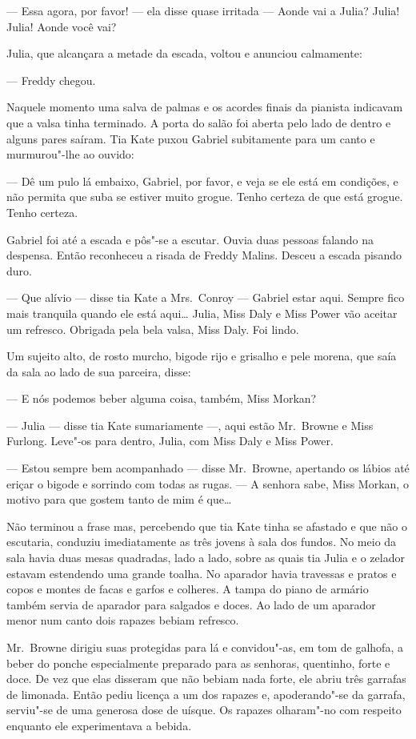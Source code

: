 --- Essa agora, por favor! --- ela disse quase irritada --- Aonde vai a Julia?
Julia!  Julia!  Aonde você vai?

Julia, que alcançara a metade da escada, voltou e anunciou calmamente:

--- Freddy chegou.

Naquele momento uma salva de palmas e os acordes finais da pianista indicavam
que a valsa tinha terminado.  A porta do salão foi aberta pelo lado de dentro e
alguns pares saíram.  Tia Kate puxou Gabriel subitamente para um canto e
murmurou"-lhe ao ouvido:

--- Dê um pulo lá embaixo, Gabriel, por favor, e veja se ele está em condições,
e não permita que suba se estiver muito grogue.  Tenho certeza de que está grogue.  Tenho
certeza.

Gabriel foi até a escada e pôs"-se a escutar.  Ouvia duas pessoas falando na
despensa.  Então reconheceu a risada de Freddy Malins.  Desceu a escada pisando
duro.

--- Que alívio --- disse tia Kate a Mrs.~Conroy --- Gabriel estar aqui.  Sempre
fico mais tranquila quando ele está aqui\ldots{}  Julia, Miss Daly e Miss Power
vão aceitar um refresco.  Obrigada pela bela valsa, Miss Daly.  Foi lindo.

Um sujeito alto, de rosto murcho, bigode rijo e grisalho e pele morena, que
saía da sala ao lado de sua parceira, disse:

--- E nós podemos beber alguma coisa, também, Miss Morkan?

--- Julia --- disse tia Kate sumariamente ---, aqui estão Mr.~Browne e Miss
Furlong.  Leve"-os para dentro, Julia, com Miss Daly e Miss Power.

--- Estou sempre bem acompanhado --- disse Mr.~Browne, apertando os lábios até
eriçar o bigode e sorrindo com todas as rugas.  --- A senhora sabe, Miss
Morkan, o motivo para que gostem tanto de mim é que\ldots{}

Não terminou a frase mas, percebendo que tia Kate tinha se afastado e que não o
escutaria, conduziu imediatamente as três jovens à sala dos fundos.  No meio da
sala havia duas mesas quadradas, lado a lado, sobre as quais tia Julia e o
zelador estavam estendendo uma grande toalha.  No aparador havia travessas e
pratos e copos e montes de facas e garfos e colheres.  A tampa do piano de
armário também servia de aparador para salgados e doces.  Ao lado de um
aparador menor num canto dois rapazes bebiam refresco.

Mr.~Browne dirigiu suas protegidas para lá e convidou"-as, em tom de galhofa, a
beber do ponche especialmente preparado para as senhoras, quentinho, forte e
doce.  De vez que elas disseram que não bebiam nada forte, ele abriu três
garrafas de limonada.  Então pediu licença a um dos rapazes e, apoderando"-se da
garrafa, serviu"-se de uma generosa dose de uísque.  Os rapazes olharam"-no com
respeito enquanto ele experimentava a bebida.

